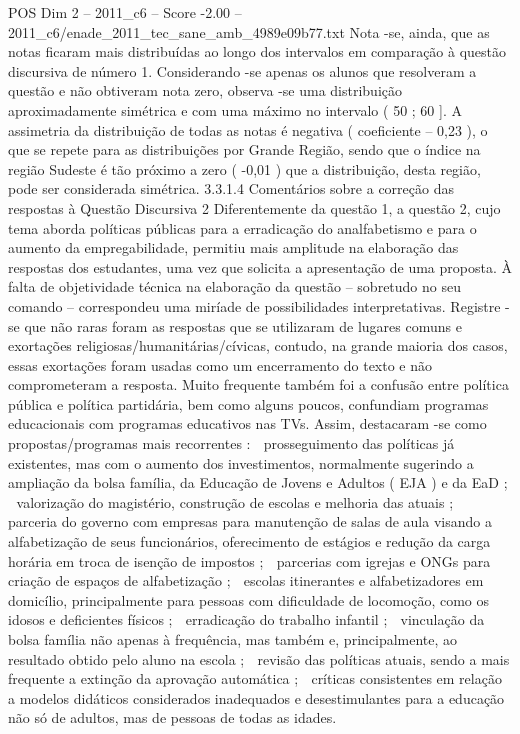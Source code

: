 \begin{textsample}{POS Dim 2 – 2011\_c6 – Score -2.00 – 2011\_c6/enade\_2011\_tec\_sane\_amb\_4989e09b77.txt}
Nota -se, ainda, que as notas ficaram mais distribuídas ao longo dos intervalos em comparação à questão discursiva de número 1.
Considerando -se apenas os alunos que resolveram a questão e não obtiveram nota zero, observa -se uma distribuição aproximadamente simétrica e com uma máximo no intervalo ( 50 ; 60 ].
A assimetria da distribuição de todas as notas é negativa ( coeficiente – 0,23 ), o que se repete para as distribuições por Grande Região, sendo que o índice na região Sudeste é tão próximo a zero ( -0,01 ) que a distribuição, desta região, pode ser considerada simétrica. 3.3.1.4 Comentários sobre a correção das respostas à Questão Discursiva 2 Diferentemente da questão 1, a questão 2, cujo tema aborda políticas públicas para a erradicação do analfabetismo e para o aumento da empregabilidade, permitiu mais amplitude na elaboração das respostas dos estudantes, uma vez que solicita a apresentação de uma proposta.
À falta de objetividade técnica na elaboração da questão – sobretudo no seu comando – correspondeu uma miríade de possibilidades interpretativas.
Registre -se que não raras foram as respostas que se utilizaram de lugares comuns e exortações religiosas/humanitárias/cívicas, contudo, na grande maioria dos casos, essas exortações foram usadas como um encerramento do texto e não comprometeram a resposta.
Muito frequente também foi a confusão entre política pública e política partidária, bem como alguns poucos, confundiam programas educacionais com programas educativos nas TVs.
Assim, destacaram -se como propostas/programas mais recorrentes :  prosseguimento das políticas já existentes, mas com o aumento dos investimentos, normalmente sugerindo a ampliação da bolsa família, da Educação de Jovens e Adultos ( EJA ) e da EaD ;  valorização do magistério, construção de escolas e melhoria das atuais ;  parceria do governo com empresas para manutenção de salas de aula visando a alfabetização de seus funcionários, oferecimento de estágios e redução da carga horária em troca de isenção de impostos ;  parcerias com igrejas e ONGs para criação de espaços de alfabetização ;  escolas itinerantes e alfabetizadores em domicílio, principalmente para pessoas com dificuldade de locomoção, como os idosos e deficientes físicos ;  erradicação do trabalho infantil ;  vinculação da bolsa família não apenas à frequência, mas também e, principalmente, ao resultado obtido pelo aluno na escola ;  revisão das políticas atuais, sendo a mais frequente a extinção da aprovação automática ;  críticas consistentes em relação a modelos didáticos considerados inadequados e desestimulantes para a educação não só de adultos, mas de pessoas de todas as idades.

\end{textsample}
